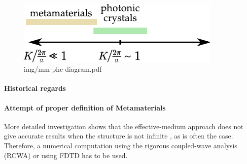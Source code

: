 \begin{figure} \caption{img/mm-phc-diagram.pdf}  \centering \includegraphics[width=10cm]{img/mm-phc-diagram.pdf} \end{figure} \clearpage


\paragraph{Historical regards}
\paragraph{Attempt of proper definition of Metamaterials}
\cite{richter1995}
\cite{kadlec2008}

More detailed investigation shows that the effective-medium approach does not give accurate results when the structure is not infinite \cite{richter1995}, as is often the case. Therefore, a numerical computation using the rigorous coupled-wave analysis (RCWA) or using FDTD has to be used.


